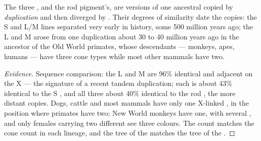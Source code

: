 \begin{proposition}\label{prop:g11:the-eye:family}
The three  , and the rod pigment's, are versions of one
ancestral  copied by \emph{duplication} and then diverged by
. Their degrees of similarity date the copies: the S and
L/M lines separated very early in  history, some 500 million
years ago; the L and M  arose from one duplication about 30 to
40 million years ago in the ancestor of the Old World primates, whose
descendants --- monkeys, apes, humans --- have three cone types while
most other mammals have two.
\end{proposition}
\begin{proof}[Evidence]
Sequence comparison: the L and M  are 96\% identical and adjacent
on the X --- the signature of a recent tandem duplication; each is
about 43\% identical to the S , and all three about 40\%
identical to the rod  , the more distant copies. Dogs, cattle
and most mammals have only one X-linked  , in the position
where primates have two; New World monkeys have one, with several
, and only females carrying two different  see three
colours. The  count matches the cone count in each lineage, and
the tree of the  matches the tree of the .
\end{proof}


